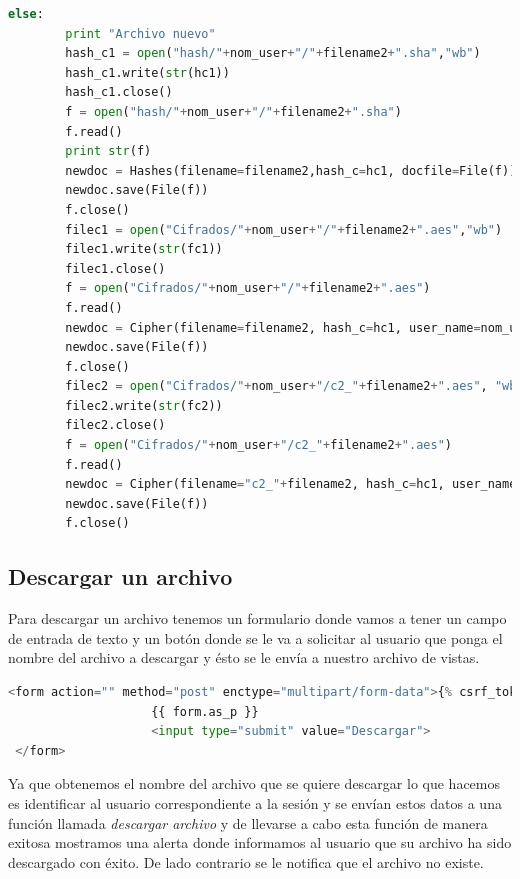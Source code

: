 \begin{lstlisting}[language=Python,frame=single, keywordstyle=\color{blue},breaklines=true, showstringspaces=false]
else:
        print "Archivo nuevo"
        hash_c1 = open("hash/"+nom_user+"/"+filename2+".sha","wb")
        hash_c1.write(str(hc1))
        hash_c1.close()
        f = open("hash/"+nom_user+"/"+filename2+".sha")
        f.read()
        print str(f)
        newdoc = Hashes(filename=filename2,hash_c=hc1, docfile=File(f))
        newdoc.save(File(f))
        f.close()
        filec1 = open("Cifrados/"+nom_user+"/"+filename2+".aes","wb")
        filec1.write(str(fc1))
        filec1.close()
        f = open("Cifrados/"+nom_user+"/"+filename2+".aes")
        f.read()
        newdoc = Cipher(filename=filename2, hash_c=hc1, user_name=nom_user, docfile=File(f))
        newdoc.save(File(f))
        f.close()
        filec2 = open("Cifrados/"+nom_user+"/c2_"+filename2+".aes", "wb")
        filec2.write(str(fc2))
        filec2.close()
        f = open("Cifrados/"+nom_user+"/c2_"+filename2+".aes")
        f.read()
        newdoc = Cipher(filename="c2_"+filename2, hash_c=hc1, user_name=nom_user, docfile=File(f))
        newdoc.save(File(f))
        f.close()
\end{lstlisting}

\subsection{Descargar un archivo} 

Para descargar un archivo tenemos un formulario donde vamos a tener un campo de entrada de texto y un botón donde se le va a solicitar al usuario que ponga el nombre del archivo a descargar y ésto se le envía a nuestro archivo de vistas.

\begin{lstlisting}[language=Python,frame=single, keywordstyle=\color{blue},breaklines=true, showstringspaces=false]
 <form action="" method="post" enctype="multipart/form-data">{% csrf_token %}
                    {{ form.as_p }}
                    <input type="submit" value="Descargar">
 </form>
\end{lstlisting}

Ya que obtenemos el nombre del archivo que se quiere descargar lo que hacemos es identificar al usuario correspondiente a la sesión y se envían estos datos a una función llamada \textit{descargar archivo} y de llevarse a cabo esta función de manera exitosa mostramos una alerta donde informamos al usuario que su archivo ha sido descargado con éxito. De lado contrario se le notifica que el archivo no existe.

